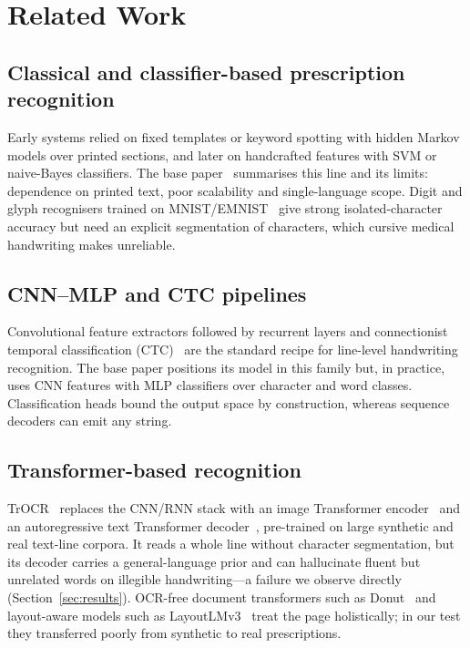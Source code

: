 \documentclass[journal]{IEEEtran}
\begin{document}
\section{Related Work}\label{sec:related}

\subsection{Classical and classifier-based prescription recognition}
Early systems relied on fixed templates or keyword spotting with hidden Markov models over printed sections, and later on handcrafted features with SVM or naive-Bayes classifiers. The base paper~\cite{biswas2026novel} summarises this line and its limits: dependence on printed text, poor scalability and single-language scope. Digit and glyph recognisers trained on MNIST/EMNIST~\cite{cohen2017emnist} give strong isolated-character accuracy but need an explicit segmentation of characters, which cursive medical handwriting makes unreliable.

\subsection{CNN--MLP and CTC pipelines}
Convolutional feature extractors followed by recurrent layers and connectionist temporal classification (CTC)~\cite{graves2006ctc,shi2017crnn} are the standard recipe for line-level handwriting recognition. The base paper positions its model in this family but, in practice, uses CNN features with MLP classifiers over character and word classes. Classification heads bound the output space by construction, whereas sequence decoders can emit any string.

\subsection{Transformer-based recognition}
TrOCR~\cite{li2023trocr} replaces the CNN/RNN stack with an image Transformer encoder~\cite{dosovitskiy2021vit} and an autoregressive text Transformer decoder~\cite{vaswani2017attention}, pre-trained on large synthetic and real text-line corpora. It reads a whole line without character segmentation, but its decoder carries a general-language prior and can hallucinate fluent but unrelated words on illegible handwriting---a failure we observe directly (Section~\ref{sec:results}). OCR-free document transformers such as Donut~\cite{kim2022donut} and layout-aware models such as LayoutLMv3~\cite{huang2022layoutlmv3} treat the page holistically; in our test they transferred poorly from synthetic to real prescriptions.
\end{document}
